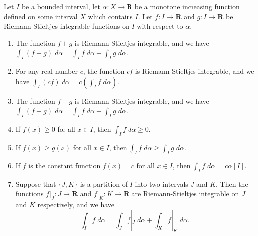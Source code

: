 \begin{additional corollary}\label{ac 11.8.10}
Let \(I\) be a bounded interval, let \(\alpha : X \to \mathbf{R}\) be a monotone increasing function defined on some interval \(X\) which contains \(I\).
Let \(f : I \to \mathbf{R}\) and \(g : I \to \mathbf{R}\) be Riemann-Stieltjes integrable functions on \(I\) with respect to \(\alpha\).
\begin{enumerate}
    \item The function \(f + g\) is Riemann-Stieltjes integrable, and we have \(\int_I (f + g) \; d \alpha = \int_I f \; d \alpha + \int_I g \; d \alpha\).
    \item For any real number \(c\), the function \(cf\) is Riemann-Stieltjes integrable, and we have \(\int_I (cf) \; d \alpha = c(\int_I f \; d \alpha)\).
    \item The function \(f - g\) is Riemann-Stieltjes integrable, and we have \(\int_I (f - g) \; d \alpha = \int_I f \; d \alpha - \int_I g \; d \alpha\).
    \item If \(f(x) \geq 0\) for all \(x \in I\), then \(\int_I f \; d \alpha \geq 0\).
    \item If \(f(x) \geq g(x)\) for all \(x \in I\), then \(\int_I f \; d \alpha \geq \int_I g \; d \alpha\).
    \item If \(f\) is the constant function \(f(x) = c\) for all \(x \in I\), then \(\int_I f \; d \alpha = c \alpha[I]\).
    \item Suppose that \(\{J, K\}\) is a partition of \(I\) into two intervals \(J\) and \(K\).
          Then the functions \(f|_J : J \to \mathbf{R}\) and \(f|_K : K \to \mathbf{R}\) are Riemann-Stieltjes integrable on \(J\) and \(K\) respectively, and we have
          \[
              \int_I f \; d \alpha = \int_J f|_J \; d \alpha + \int_K f|_K \; d \alpha.
          \]
\end{enumerate}
\end{additional corollary}

